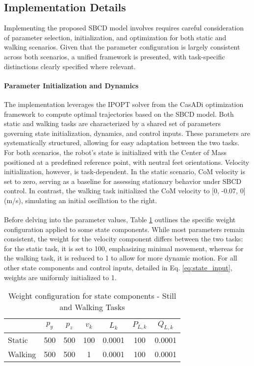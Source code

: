 \documentclass[main.tex]{subfiles}
\begin{document}
\begin{sloppypar}
\subsection{Implementation Details}
Implementing the proposed SBCD model involves requires careful consideration of parameter selection, initialization, and optimization for both static and walking scenarios. Given that the parameter configuration is largely consistent across both scenarios, a unified framework is presented, with task-specific distinctions clearly specified where relevant.
\paragraph{Parameter Initialization and Dynamics} The implementation leverages the IPOPT solver from the CasADi optimization framework to compute optimal trajectories based on the SBCD model. Both static and walking tasks are characterized by a shared set of parameters governing state initialization, dynamics, and control inputs. These parameters are systematically structured, allowing for easy adaptation between the two tasks. For both scenarios, the robot’s state is initialized with the Center of Mass positioned at a predefined reference point, with neutral feet orientations. Velocity initialization, however, is task-dependent. In the static scenario, CoM velocity is set to zero, serving as a baseline for assessing stationary behavior under SBCD control. In contrast, the walking task initialized the CoM velocity to [0, -0.07, 0]  (m/s), simulating an initial oscillation to the right. \\ 
\\
Before delving into the parameter values, Table \ref{tab:weight_states} outlines the specific weight configuration applied to some state components. While most parameters remain consistent, the weight for the velocity component differs between the two tasks: for the static task, it is set to 100, emphasizing minimal movement, whereas for the walking task, it is reduced to 1 to allow for more dynamic motion. For all other state components and control inputs, detailed in Eq. \eqref{eq:state_input}, weights are uniformly initialized to 1.
\begin{table}[h!]
    \centering
    \begin{tabular}{lcccccc}
    \toprule
    & $p_y$ & $p_z$ & $v_k$ & $L_k$ & $P_{L,k}$ & $Q_{L,k}$ \\
    \midrule
    Static & 500 & 500 & 100 & 0.0001 & 100 & 0.0001 \\
    Walking & 500 & 500 & 1 & 0.0001 & 100 & 0.0001 \\
    \bottomrule
    \end{tabular}
    \caption{Weight configuration for state components - Still and Walking Tasks}
    \label{tab:weight_states}
\end{table}

\end{sloppypar}
\end{document}
